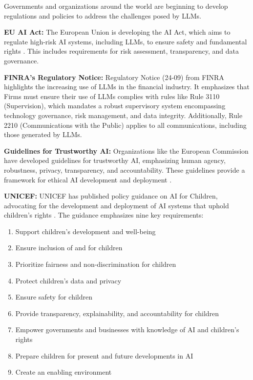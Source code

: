 Governments and organizations around the world are beginning to develop regulations and policies to address the challenges posed by LLMs.

\textbf{EU AI Act:} The European Union is developing the AI Act, which aims to regulate high-risk AI systems, including LLMs, to ensure safety and fundamental rights . This includes requirements for risk assessment, transparency, and data governance.  

\textbf{FINRA's Regulatory Notice:} Regulatory Notice (24-09)  from FINRA highlights the increasing use of LLMs in the financial industry. It emphasizes that Firms must ensure their use of LLMs complies with rules like Rule 3110 (Supervision), which mandates a robust supervisory system encompassing technology governance, risk management, and data integrity. Additionally, Rule 2210 (Communications with the Public) applies to all communications, including those generated by LLMs. 

\textbf{Guidelines for Trustworthy AI:} Organizations like the European Commission have developed guidelines for trustworthy AI, emphasizing human agency, robustness, privacy, transparency, and accountability. These guidelines provide a framework for ethical AI development and deployment .

\textbf{UNICEF:} UNICEF has published policy guidance on AI for Children, advocating for the development and deployment of AI systems that uphold children's rights . The guidance emphasizes nine key requirements:
\begin{enumerate}
    \item Support children's development and well-being
    \item Ensure inclusion of and for children
    \item Prioritize fairness and non-discrimination for children
    \item Protect children's data and privacy
    \item Ensure safety for children
    \item Provide transparency, explainability, and accountability for children
    \item Empower governments and businesses with knowledge of AI and children's rights
    \item Prepare children for present and future developments in AI
    \item Create an enabling environment
\end{enumerate}

